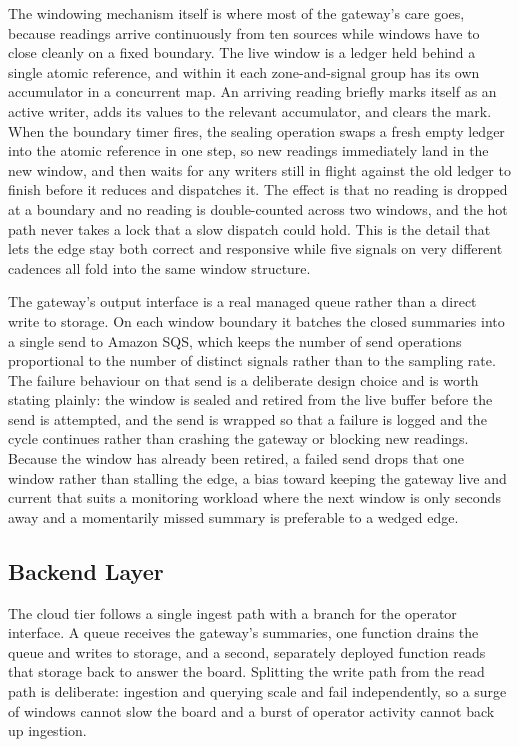 \documentclass[conference]{IEEEtran}
\begin{document}
The windowing mechanism itself is where most of the gateway's care goes, because readings arrive continuously from ten sources while windows have to close cleanly on a fixed boundary. The live window is a ledger held behind a single atomic reference, and within it each zone-and-signal group has its own accumulator in a concurrent map. An arriving reading briefly marks itself as an active writer, adds its values to the relevant accumulator, and clears the mark. When the boundary timer fires, the sealing operation swaps a fresh empty ledger into the atomic reference in one step, so new readings immediately land in the new window, and then waits for any writers still in flight against the old ledger to finish before it reduces and dispatches it. The effect is that no reading is dropped at a boundary and no reading is double-counted across two windows, and the hot path never takes a lock that a slow dispatch could hold. This is the detail that lets the edge stay both correct and responsive while five signals on very different cadences all fold into the same window structure.

The gateway's output interface is a real managed queue rather than a direct write to storage. On each window boundary it batches the closed summaries into a single send to Amazon SQS, which keeps the number of send operations proportional to the number of distinct signals rather than to the sampling rate. The failure behaviour on that send is a deliberate design choice and is worth stating plainly: the window is sealed and retired from the live buffer before the send is attempted, and the send is wrapped so that a failure is logged and the cycle continues rather than crashing the gateway or blocking new readings. Because the window has already been retired, a failed send drops that one window rather than stalling the edge, a bias toward keeping the gateway live and current that suits a monitoring workload where the next window is only seconds away and a momentarily missed summary is preferable to a wedged edge.

\subsection{Backend Layer}

The cloud tier follows a single ingest path with a branch for the operator interface. A queue receives the gateway's summaries, one function drains the queue and writes to storage, and a second, separately deployed function reads that storage back to answer the board. Splitting the write path from the read path is deliberate: ingestion and querying scale and fail independently, so a surge of windows cannot slow the board and a burst of operator activity cannot back up ingestion.
\end{document}

